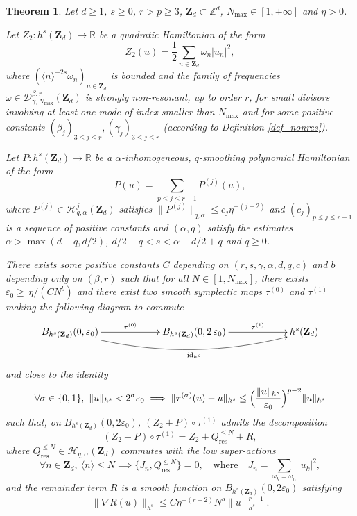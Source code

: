 \documentclass[11pt]{article}
\newtheorem{theorem}{Theorem}[section]
\theoremstyle{definition}
\begin{document}
\begin{theorem}
\label{thm_NF}
Let $d\geq 1$, $s\geq 0$, $r>p\geq 3$, $\mathbf{Z}_d \subset \mathbb{Z}^d$, $N_{\max}\in [1,+\infty]$ and $\eta>0$.

Let $Z_2: h^s(\mathbf{Z}_d) \to \mathbb{R}$ be a quadratic Hamiltonian of the form
\[
Z_2(u) = \frac12 \sum_{n\in \mathbf{Z}_d} \omega_n |u_n|^2,
\]
where $(\langle n \rangle^{-2s} \omega_n)_{n\in \mathbf{Z}_d}$ is bounded and the family of frequencies $\omega \in \mathcal{D}_{\gamma,N_{\max}}^{\beta,r}(\mathbf{Z}_d)$ is strongly non-resonant, up to order $r$, for small divisors involving at least one mode of index smaller than $N_{\max}$ and for some positive constants $(\beta_j)_{3\leq j\leq r},(\gamma_j)_{3\leq j\leq r}$ (according to Definition \ref{def_nonres}).

Let $P: h^s(\mathbf{Z}_d) \to \mathbb{R}$ be a $\alpha$-inhomogeneous, $q$-smoothing polynomial Hamiltonian of the form
\[
P(u) = \sum_{p\leq j\leq r-1} P^{(j)}(u),
\]
where $P^{(j)} \in \mathscr{H}_{q,\alpha}^j(\mathbf{Z}_d) $ satisfies $\| P^{(j)}\|_{q,\alpha} \leq c_j \eta^{-(j-2)}$ and $(c_j)_{p\leq j\leq r-1}$ is a sequence of positive constants and $(\alpha,q)$ satisfy the estimates $\alpha >\max(d-q,d/2)$, $d/2-q<s<\alpha-d/2+q$ and $q\geq 0$.

There exists some positive constants $C$ depending on $(r,s,\gamma,\alpha,d,q,c)$ and $b$ depending only on $(\beta,r)$ such that
for all $N\in [1,N_{\max}]$, there exists $\varepsilon_0 \geq \, \eta /(C N^{b})$ and there exist two smooth symplectic maps $\tau^{(0)}$ and $\tau^{(1)}$
making the following diagram to commute
\begin{equation}
\label{mon_beau_diagram_roi_des_forets}
\xymatrixcolsep{5pc} \xymatrix{ B_{h^s(\mathbf{Z}_d)}(0, \varepsilon_0) \ar[r]^-{\tau^{(0)}}
\ar@/_1.5pc/[rr]_-{\mathrm{id}_{{h}^s}} & B_{h^s(\mathbf{Z}_d)}(0,2\, \varepsilon_0) \ar[r]^-{\tau^{(1)}} &
h^s(\mathbf{Z}_d) }
\end{equation}
and close to the identity
\begin{align*}
\forall \sigma\in \{0,1\}, \ \|u\|_{{h}^s} <2^{\sigma}\varepsilon_0 \implies
\|\tau^{(\sigma)}(u)-u\|_{h^s} \leq \Bigl(\frac{\|u\|_{h^s}}{\varepsilon_0} \Bigr)^{p-2} \|u\|_{h^s}
\end{align*}
such that, on $ B_{h^s(\mathbf{Z}_d)}(0,2\varepsilon_0)$, $(Z_2+P) \circ \tau^{(1)}$ admits the decomposition
\begin{equation}\label{eq_NF}
(Z_2+P) \circ \tau^{(1)} = Z_2+ Q^{\leq N}_{\mathrm{res}} + R,
\end{equation}
where $Q^{\leq N}_{\mathrm{res}} \in \mathscr{H}_{q,\alpha}(\mathbf{Z}_d)$ commutes with the low super-actions
\begin{equation}
\label{eq_ca_commte}
\forall n \in \mathbf{Z}_d, \ \langle n \rangle \leq N \implies \{ J_n, Q^{\leq N}_{\mathrm{res}} \} = 0, \quad \text{where} \quad J_n = \sum_{ \omega_k = \omega_n} |u_k|^2,
\end{equation}
and the remainder term $R$ is a smooth function on $ B_{h^s(\mathbf{Z}_d)}(0,2\varepsilon_0)$ satisfying
\[
\|\nabla R(u)\|_{h^s} \leq C \eta^{-(r-2)} N^{b} \|u\|_{h^s}^{r-1}.
\]


\end{theorem}
\end{document}
